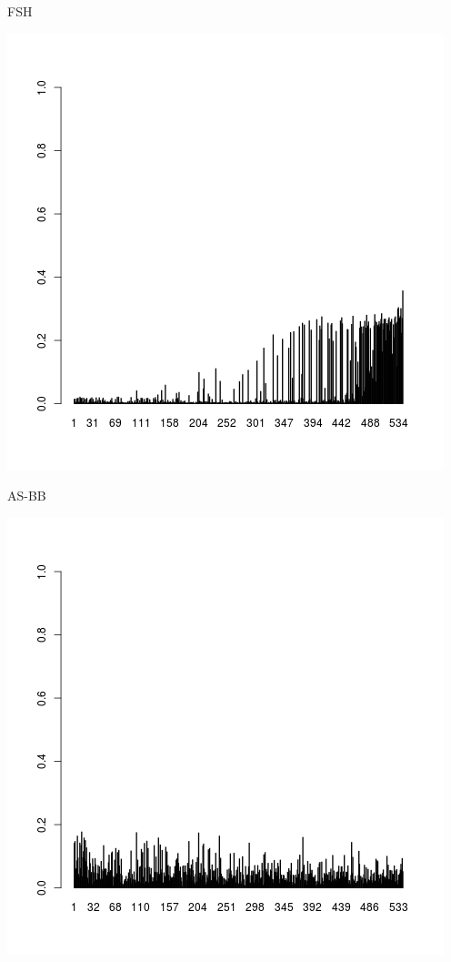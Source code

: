 \documentclass{beamer}
\begin{document}
\begin{frame}{FSH}
  \begin{center}
    \includegraphics[scale = .45]{ItemExposureFSH.png}
  \end{center}
\end{frame}

\begin{frame}{AS-BB}
  \begin{center}
    \includegraphics[scale = .45]{ItemExposureASBB.png}
  \end{center}
\end{frame}
\end{document}
